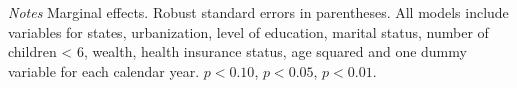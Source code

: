 \documentclass[12pt,english]{article}
\begin{document}
{\begin{table}[!ht]
\begin{center}
\begin{adjustbox}{max width=\linewidth}
\begin{threeparttable}
{					\begin{tablenotes}
						\item \footnotesize \textit{Notes} Marginal effects. Robust standard errors in parentheses. All models include variables for  states, urbanization, level of education, marital status, number of children < 6, wealth, health insurance status, age squared and one dummy variable for each calendar year. \sym{*} \(p<0.10\), \sym{**} \(p<0.05\), \sym{***} \(p<0.01\).
					\end{tablenotes}
				}
			\end{threeparttable}
		\end{adjustbox}
	\end{center}
\end{table} 

}
\end{document}
